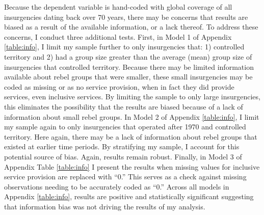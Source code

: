 \documentclass[12pt, letterpaper]{article}
\begin{document}

Because the dependent variable is hand-coded with global coverage of all insurgencies dating back over 70 years, there may be concerns that results are biased as a result of the available information, or a lack thereof. To address these concerns, I conduct three additional tests. First, in Model 1 of Appendix \autoref{table:info}, I limit my sample further to only insurgencies that: 1) controlled territory and 2) had a group size greater than the average (mean) group size of insurgencies that controlled territory. Because there may be limited information available about rebel groups that were smaller, these small insurgencies may be coded as missing or as no service provision, when in fact they did provide services, even inclusive services. By limiting the sample to only large insurgencies, this eliminates the possibility that the results are biased because of a lack of information about small rebel groups. In Model 2 of Appendix \autoref{table:info}, I limit my sample again to only insurgencies that operated after 1970 and controlled territory. Here again, there may be a lack of information about rebel groups that existed at earlier time periods. By stratifying my sample, I account for this potential source of bias. Again, results remain robust. Finally, in Model 3 of Appendix Table \ref{table:info} I present the results when missing values for inclusive service provision are replaced with ``0.'' This serves as a check against missing observations needing to be accurately coded as ``0.'' Across all models in Appendix \autoref{table:info}, results are positive and statistically significant suggesting that information bias was not driving the results of my analysis. %
\end{document}
